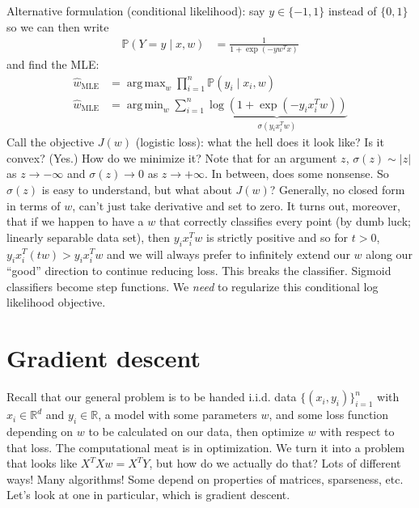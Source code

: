 \documentclass[11pt,letterpaper]{article}
\DeclareMathOperator*{\argmin}{arg\,min}
\DeclareMathOperator*{\argmax}{arg\,max}
\numberwithin{equation}{section}
\numberwithin{figure}{section}
\begin{document}
Alternative formulation (conditional likelihood): say $y \in \{-1,1\}$ instead of $\{0,1\}$ so we can then write
%
\begin{align}
	\mathbb{P}(Y=y \mid x,w) &= \frac{1}{1+\exp\left(-y w^T x\right)}
\end{align}
%
and find the MLE:
%
\begin{align}
	\hat{w}_\mathrm{MLE} &= \argmax_w \prod_{i=1}^n \mathbb{P}(y_i \mid x_i,w)\\
	\hat{w}_\mathrm{MLE} &= \argmin_w \sum_{i=1}^n \underbrace{\log\left(1+ \exp\left(-y_i x_i^T w\right) \right)}_{\sigma(y_i x_i^T w)}
\end{align}
%
Call the objective $J(w)$ (logistic loss): what the hell does it look like? Is it convex? (Yes.) How do we minimize it? Note that for an argument $z$, $\sigma(z) \sim |z|$ as $z \to -\infty$ and $\sigma(z) \to 0$ as $z \to +\infty$. In between, does some nonsense. So $\sigma(z)$ is easy to understand, but what about $J(w)$? Generally, no closed form in terms of $w$, can't just take derivative and set to zero. It turns out, moreover, that if we happen to have a $w$ that correctly classifies every point (by dumb luck; linearly separable data set), then $y_i x_i^T w$ is strictly positive and so for $t > 0$, $y_i x_i^T (tw) > y_i x_i^T w$ and we will always prefer to infinitely extend our $w$ along our ``good'' direction to continue reducing loss. This breaks the classifier. Sigmoid classifiers become step functions. We \emph{need} to regularize this conditional log likelihood objective.













\section{Gradient descent}
Recall that our general problem is to be handed i.i.d. data $\{(x_i,y_i)\}_{i=1}^n$ with $x_i \in \mathbb{R}^d$ and $y_i \in \mathbb{R}$, a model with some parameters $w$, and some loss function depending on $w$ to be calculated on our data, then optimize $w$ with respect to that loss. The computational meat is in optimization. We turn it into a problem that looks like $X^T X w = X^T Y$, but how do we actually do that? Lots of different ways! Many algorithms! Some depend on properties of matrices, sparseness, etc. Let's look at one in particular, which is gradient descent.
\end{document}
